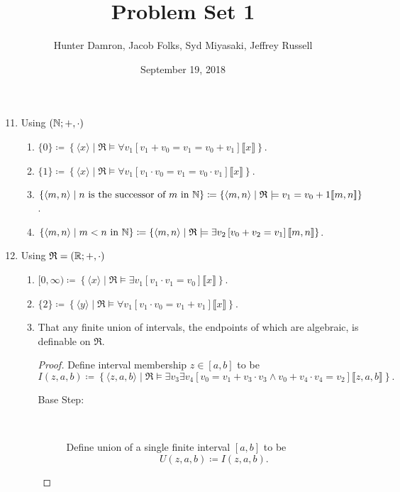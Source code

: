\documentclass{homework}
\title{Problem Set 1}
\author{Hunter Damron, Jacob Folks, Syd Miyasaki, Jeffrey Russell}
\date{September 19, 2018}
\begin{document}
	\maketitle
	\begin{enumerate}
		\setcounter{enumi}{10}
		\item Using $(\mathbb{N}; +, \cdot)$
		\begin{enumerate}
			\item $\{0\} \coloneqq \left\{ \langle x \rangle \mid \mathfrak{R} \models \forall v_1 \left[v_1 + v_0 = v_1 = v_0 + v_1\right] \lBrack x \rBrack \right\} $.
			\item $\{1\} \coloneqq \left\{ \langle x \rangle \mid \mathfrak{R} \models \forall v_1 \left[v_1 \cdot v_0 = v_1 = v_0 \cdot v_1 \right] \lBrack x \rBrack \right\}$.
			\item $\{\langle m,n \rangle \mid n \text{ is the successor of } m \text{ in } \mathbb{N}\} \coloneqq \left\{ \langle m,n \rangle \mid \mathfrak{R} \models v_1 = v_0 + 1 \mathbb{[\![} m,n \mathbb{]\!]} \right\}$. %
			\item $\{\langle m,n \rangle \mid m < n \text{ in } \mathbb{N}\} \coloneqq \left\{ \langle m,n \rangle \mid \mathfrak{R} \models \exists v_2 \left[v_0 + v_2 = v_1 \right] \mathbb{[\![} m,n \mathbb{]\!]} \right\}$.
		\end{enumerate}
		\item Using $\mathfrak{R} = (\mathbb{R}; +, \cdot)$
		\begin{enumerate}
			\item $[0, \infty) \coloneqq \left\{ \langle x \rangle \mid \mathfrak{R} \models \exists v_1 \left[v_1 \cdot v_1 = v_0\right] \lBrack x \rBrack \right\}$.
			\item $\{2\} \coloneqq \left\{\langle y \rangle \mid \mathfrak{R} \models \forall v_1 [v_1 \cdot v_0 = v_1 + v_1] \lBrack x \rBrack \right\}$.
			\item That any finite union of intervals, the endpoints of which are algebraic, is definable on $\mathfrak{R}$.
			\begin{proof}
				Define interval membership $z \in [a,b]$ to be
				\[ I(z,a,b) \coloneqq \left\{\langle z,a,b \rangle \mid \mathfrak{R} \models \exists v_3 \exists v_4 \left[v_0 = v_1 + v_3 \cdot v_3 \land v_0 + v_4 \cdot v_4 = v_2\right] \lBrack z,a,b \rBrack \right\}. \]
				
				\begin{description}
					\item[Base Step: ]~\par
					Define union of a single finite interval $[a,b]$ to be
					\[ U(z,a,b) \coloneqq I(z,a,b). \]
					

\end{description}
\end{proof}
\end{enumerate}
\end{enumerate}
\end{document}
